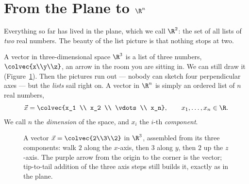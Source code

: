 \section{From the Plane to \texorpdfstring{$\R^n$}{Rn}}
\label{ch02:rn}

Everything so far has lived in the plane, which we call $\R^2$: the set of all lists of
\emph{two} real numbers. The beauty of the list picture is that nothing stops at two.

A vector in three-dimensional space $\R^3$ is a list of three numbers,
$\colvec{x\\y\\z}$, an arrow in the room you are sitting in. We can still draw it
(Figure~\ref{ch02:fig-r3}). Then the pictures run out --- nobody can sketch four
perpendicular axes --- but the \emph{lists} sail right on. A vector in $\R^n$ is simply
an ordered list of $n$ real numbers,
\[
  \vec{x} = \colvec{x_1 \\ x_2 \\ \vdots \\ x_n},
  \qquad x_1,\dots,x_n \in \R.
\]
We call $n$ the \emph{dimension} of the space, and $x_i$ the $i$-th \emph{component}.

\begin{figure}[H]
\centering
{}
\caption{A vector $\vec{x}=\colvec{2\\3\\2}$ in $\R^3$, assembled from its three
components: walk $2$ along the $x$-axis, then $3$ along $y$, then $2$ up the $z$-axis. The
purple arrow from the origin to the corner is the vector; tip-to-tail addition of the
three axis steps still builds it, exactly as in the plane.}
\label{ch02:fig-r3}
\end{figure}

